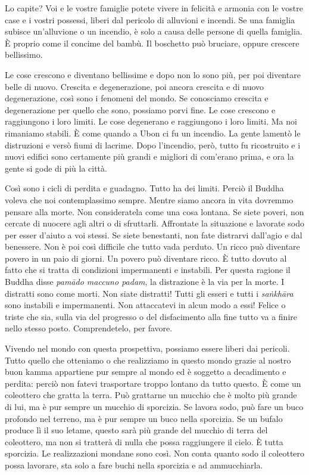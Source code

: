 Lo capite? Voi e le vostre famiglie potete vivere in felicità e armonia
con le vostre case e i vostri possessi, liberi dal pericolo di alluvioni
e incendi. Se una famiglia subisce un'alluvione o un incendio, è solo a
causa delle persone di quella famiglia. È proprio come il concime del
bambù. Il boschetto può bruciare, oppure crescere bellissimo.

Le cose crescono e diventano bellissime e dopo non lo sono più, per poi
diventare belle di nuovo. Crescita e degenerazione, poi ancora crescita
e di nuovo degenerazione, così sono i fenomeni del mondo. Se conosciamo
crescita e degenerazione per quello che sono, possiamo porvi fine. Le
cose crescono e raggiungono i loro limiti. Le cose degenerano e
raggiungono i loro limiti. Ma noi rimaniamo stabili. È come quando a
Ubon ci fu un incendio. La gente lamentò le distruzioni e versò fiumi di
lacrime. Dopo l'incendio, però, tutto fu ricostruito e i nuovi edifici
sono certamente più grandi e migliori di com'erano prima, e ora la gente
si gode di più la città.

Così sono i cicli di perdita e guadagno. Tutto ha dei limiti. Perciò il
Buddha voleva che noi contemplassimo sempre. Mentre siamo ancora in vita
dovremmo pensare alla morte. Non consideratela come una cosa lontana. Se
siete poveri, non cercate di nuocere agli altri o di sfruttarli.
Affrontate la situazione e lavorate sodo per esser d'aiuto a voi stessi.
Se siete benestanti, non fate distrarvi dall'agio e dal benessere. Non è
poi così difficile che tutto vada perduto. Un ricco può diventare povero
in un paio di giorni. Un povero può diventare ricco. È tutto dovuto al
fatto che si tratta di condizioni impermanenti e instabili. Per questa
ragione il Buddha disse \emph{pamādo maccuno padam}, la distrazione è la
via per la morte. I distratti sono come morti. Non siate distratti!
Tutti gli esseri e tutti i \emph{saṅkhāra} sono instabili e
impermanenti. Non attaccatevi in alcun modo a essi! Felice o triste che
sia, sulla via del progresso o del disfacimento alla fine tutto va a
finire nello stesso posto. Comprendetelo, per favore.

Vivendo nel mondo con questa prospettiva, possiamo essere liberi dai
pericoli. Tutto quello che otteniamo o che realizziamo in questo mondo
grazie al nostro buon kamma appartiene pur sempre al mondo ed è
soggetto a decadimento e perdita: perciò non fatevi trasportare troppo
lontano da tutto questo. È come un coleottero che gratta la terra. Può
grattarne un mucchio che è molto più grande di lui, ma è pur sempre un
mucchio di sporcizia. Se lavora sodo, può fare un buco profondo nel
terreno, ma è pur sempre un buco nella sporcizia. Se un bufalo produce
lì il suo letame, questo sarà più grande del mucchio di terra del
coleottero, ma non si tratterà di nulla che possa raggiungere il cielo.
È tutta sporcizia. Le realizzazioni mondane sono così. Non conta quanto
sodo il coleottero possa lavorare, sta solo a fare buchi nella sporcizia
e ad ammucchiarla.


